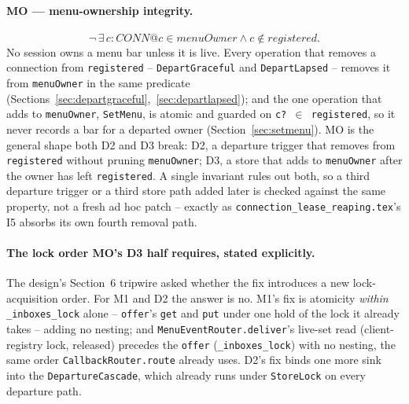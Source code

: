 \documentclass[a4paper,10pt,fleqn]{article}
\begin{document}
\paragraph{MO --- menu-ownership integrity.}
\[
  \lnot\, \exists\, c : CONN @ c \in menuOwner \land c \notin registered.
\]
No session owns a menu bar unless it is live. Every operation that removes a
connection from \texttt{registered} -- \texttt{DepartGraceful} and
\texttt{DepartLapsed} -- removes it from \texttt{menuOwner} in the same
predicate (Sections~\ref{sec:departgraceful},~\ref{sec:departlapsed}); and
the one operation that adds to \texttt{menuOwner}, \texttt{SetMenu}, is
atomic and guarded on \texttt{c? $\in$ registered}, so it never records a bar
for a departed owner (Section~\ref{sec:setmenu}). MO is the general shape
both D2 and D3 break: D2, a departure trigger that removes from
\texttt{registered} without pruning \texttt{menuOwner}; D3, a store that
adds to \texttt{menuOwner} after the owner has left \texttt{registered}. A
single invariant rules out both, so a third departure trigger or a third
store path added later is checked against the same property, not a fresh ad
hoc patch -- exactly as \texttt{connection\_lease\_reaping.tex}'s I5 absorbs
its own fourth removal path.

\paragraph{The lock order MO's D3 half requires, stated explicitly.}
\label{sec:lockorder}
The design's Section~6 tripwire asked whether the fix introduces a new
lock-acquisition order. For M1 and D2 the answer is no. M1's fix is
atomicity \emph{within} \texttt{\_inboxes\_lock} alone -- \texttt{offer}'s
\texttt{get} and \texttt{put} under one hold of the lock it already takes --
adding no nesting; and \texttt{MenuEventRouter.deliver}'s live-set read
(client-registry lock, released) precedes the \texttt{offer}
(\texttt{\_inboxes\_lock}) with no nesting, the same order
\texttt{CallbackRouter.route} already uses. D2's fix binds one more sink
into the \texttt{DepartureCascade}, which already runs under
\texttt{StoreLock} on every departure path.
\end{document}
